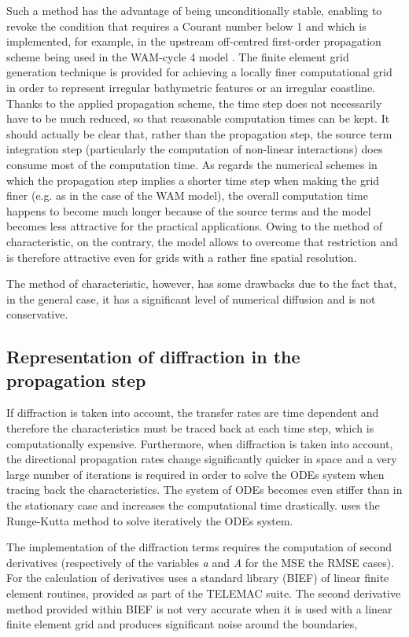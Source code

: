  Such a method has the advantage of being unconditionally stable, enabling to revoke the condition that requires a Courant number below 1 and which is implemented, for example, in the upstream off-centred first-order propagation scheme being used in the WAM-cycle 4 model \cite{Wamdi1988} \cite{Komen1994}. The finite element grid generation technique is provided for achieving a locally finer computational grid in order to represent irregular bathymetric features or an irregular coastline. Thanks to the applied propagation scheme, the time step does not necessarily have to be much reduced, so that reasonable computation times can be kept. It should actually be clear that, rather than the propagation step, the source term integration step (particularly the computation of non-linear interactions) does consume most of the computation time. As regards the numerical schemes in which the propagation step implies a shorter time step when making the grid finer (e.g. as in the case of the WAM model), the overall computation time happens to become much longer because of the source terms and the model becomes less attractive for the practical applications. Owing to the method of characteristic, on the contrary, the \tomawac model allows to overcome that restriction and is therefore attractive even for grids with a rather fine spatial resolution.

 The method of characteristic, however, has some drawbacks due to the fact that, in the general case, it has a significant level of numerical diffusion and is not conservative.


\subsection{ Representation of diffraction in the propagation step}

 If diffraction is taken into account, the transfer rates are time dependent and therefore the characteristics must be traced back at each time step, which is computationally expensive. Furthermore, when diffraction is taken into account, the directional propagation rates change significantly quicker in space and a very large number of iterations is required in order to solve the ODEs system when tracing back the characteristics. The system of ODEs becomes even stiffer than in the stationary case and increases the computational time drastically. \tomawac uses the Runge-Kutta method to solve iteratively the ODEs system.

 The implementation of the diffraction terms requires the computation of second derivatives (respectively of the variables \textit{a} and \textit{A} for the MSE the RMSE cases). For the calculation of derivatives \tomawac uses a standard library (BIEF) of linear finite element routines, provided as part of the TELEMAC suite. The second derivative method provided within BIEF is not very accurate when it is used with a linear finite element grid and produces significant noise around the boundaries,

